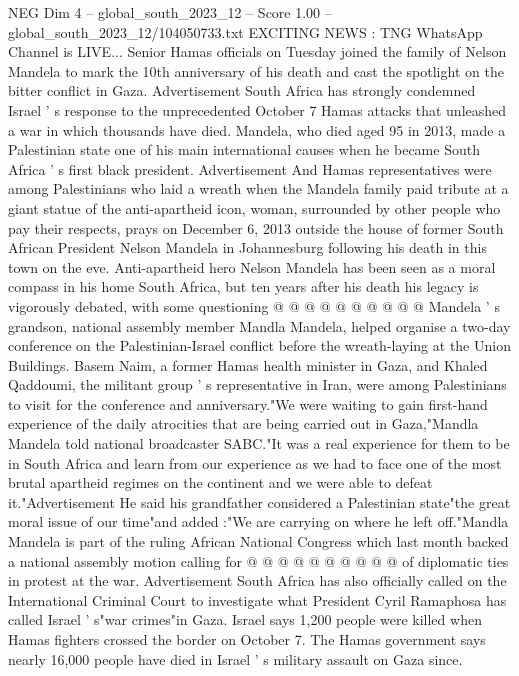 \begin{textsample}{NEG Dim 4 – global\_south\_2023\_12 – Score 1.00 – global\_south\_2023\_12/104050733.txt}  \label{ex:f4_neg_316}
EXCITING NEWS : TNG WhatsApp Channel is LIVE...
Senior Hamas officials on Tuesday joined the family of Nelson Mandela to mark the 10th anniversary of his death and cast the spotlight on the bitter conflict in Gaza.
Advertisement South Africa has strongly condemned Israel ' s response to the unprecedented October 7 Hamas attacks that unleashed a war in which thousands have died.
Mandela, who died aged 95 in 2013, made a Palestinian state one of his main international causes when he became South Africa ' s first black president.
Advertisement And Hamas representatives were among Palestinians who laid a wreath when the Mandela family paid tribute at a giant statue of the anti-apartheid icon, woman, surrounded by other people who pay their respects, prays on December 6, 2013 outside the house of former South African President Nelson Mandela in Johannesburg following his death in this town on the eve.
Anti-apartheid hero Nelson Mandela has been seen as a moral compass in his home South Africa, but ten years after his death his legacy is vigorously debated, with some questioning @ @ @ @ @ @ @ @ @ @ Mandela ' s grandson, national assembly member Mandla Mandela, helped organise a two-day conference on the Palestinian-Israel conflict before the wreath-laying at the Union Buildings.
Basem Naim, a former Hamas health minister in Gaza, and Khaled Qaddoumi, the militant group ' s representative in Iran, were among Palestinians to visit for the conference and anniversary."We were waiting to gain first-hand experience of the daily atrocities that are being carried out in Gaza,"Mandla Mandela told national broadcaster SABC."It was a real experience for them to be in South Africa and learn from our experience as we had to face one of the most brutal apartheid regimes on the continent and we were able to defeat it."Advertisement He said his grandfather considered a Palestinian state"the great moral issue of our time"and added :"We are carrying on where he left off."Mandla Mandela is part of the ruling African National Congress which last month backed a national assembly motion calling for @ @ @ @ @ @ @ @ @ @ of diplomatic ties in protest at the war.
Advertisement South Africa has also officially called on the International Criminal Court to investigate what President Cyril Ramaphosa has called Israel ' s"war crimes"in Gaza.
Israel says 1,200 people were killed when Hamas fighters crossed the border on October 7.
The Hamas government says nearly 16,000 people have died in Israel ' s military assault on Gaza since.

\end{textsample}
